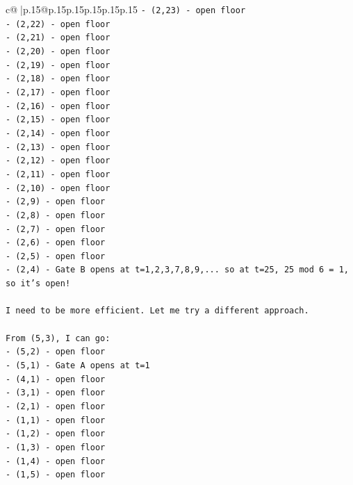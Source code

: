 \documentclass{article}
\begin{document}
{\begin{supertabular}{c@{$\;$}|p{.15\linewidth}@{}p{.15\linewidth}p{.15\linewidth}p{.15\linewidth}p{.15\linewidth}p{.15\linewidth}}
{{{\texttt{{-} (2,23) {-} open floor} \\
\texttt{{-} (2,22) {-} open floor} \\
\texttt{{-} (2,21) {-} open floor} \\
\texttt{{-} (2,20) {-} open floor} \\
\texttt{{-} (2,19) {-} open floor} \\
\texttt{{-} (2,18) {-} open floor} \\
\texttt{{-} (2,17) {-} open floor} \\
\texttt{{-} (2,16) {-} open floor} \\
\texttt{{-} (2,15) {-} open floor} \\
\texttt{{-} (2,14) {-} open floor} \\
\texttt{{-} (2,13) {-} open floor} \\
\texttt{{-} (2,12) {-} open floor} \\
\texttt{{-} (2,11) {-} open floor} \\
\texttt{{-} (2,10) {-} open floor} \\
\texttt{{-} (2,9) {-} open floor} \\
\texttt{{-} (2,8) {-} open floor} \\
\texttt{{-} (2,7) {-} open floor} \\
\texttt{{-} (2,6) {-} open floor} \\
\texttt{{-} (2,5) {-} open floor} \\
\texttt{{-} (2,4) {-} Gate B opens at t=1,2,3,7,8,9,... so at t=25, 25 mod 6 = 1, so it's open!} \\
\\ 
\texttt{I need to be more efficient. Let me try a different approach.} \\
\\ 
\texttt{From (5,3), I can go:} \\
\texttt{{-} (5,2) {-} open floor} \\
\texttt{{-} (5,1) {-} Gate A opens at t=1} \\
\texttt{{-} (4,1) {-} open floor} \\
\texttt{{-} (3,1) {-} open floor} \\
\texttt{{-} (2,1) {-} open floor} \\
\texttt{{-} (1,1) {-} open floor} \\
\texttt{{-} (1,2) {-} open floor} \\
\texttt{{-} (1,3) {-} open floor} \\
\texttt{{-} (1,4) {-} open floor} \\
\texttt{{-} (1,5) {-} open floor} \\
}}}
\end{supertabular}}
\end{document}
